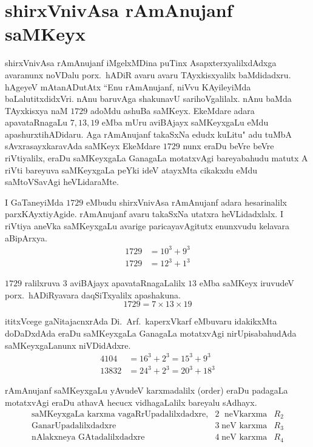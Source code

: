 \chapter{shirxVnivAsa rAmAnujanf saMKeyx}

shirxVnivAsa rAmAnujanf iMgelxMDina puTinx AsapxterxyalilxdAdxga avaranunx noVDalu  porx.~hADiR avaru avaru TAyxkisxyalilx baMdidadxru. hAgeyeV mAtanADutAtx ``Enu rAmAnujanf, niVvu KAyileyiMda baLalutitxdidxVri. nAnu baruvAga shaku\-navU sarihoVgalilalx. nAnu baMda TAyxkisxya naM $1729$ adoMdu ashuBa saMKeyx. EkeMdare adara apavataRnagaLu $7,13,19$ eMba mUru aviBAjayx saMKeyxgaLu eMdu apa\-shurxtihADidaru. Aga rAmAnujanf takaSxNa edudx kuLitu" adu tuMbA sAvxrasayxkaravAda saMKeyx EkeMdare $1729$ nunx eraDu beVre beVre riVtiyalilx, eraDu saMKeyxgaLa GanagaLa motatxvAgi bareyabahudu matutx A riVti bareyuva saMKeyxgaLa peYki ideV atayxMta cikakxdu eMdu saMtoVSavAgi heVLidaraMte.

I GaTaneyiMda $1729$ eMbudu shirxVnivAsa rAmAnujanf adara hesarinalilx parxKAyxtiyAgide. rAmAnujanf avaru takaSxNa utatxra heVLidadxlalx. I riVtiya aneVka saMKeyxgaLu avarige paricayavAgitutx enunxvudu kelavara aBipArxya.
\begin{align*}
1729 &= 10^3+9^3\\
1729 &= 12^3+1^3 
\end{align*}

$1729$ ralilxruva $3$ aviBAjayx apavataRnagaLalilx $13$ eMba saMKeyx iruvudeV porx.~hADiRyavara daqSiTxyalilx apashakuna.
$$
1729 = 7\times 13 \times 19
$$

ititxVcege gaNitajacnxrAda Di.~Arf.\ kaperxVkarf eMbuvaru idakikxMta doDaDxdAda eraDu saMKeyxgaLa GanagaLa motatxvAgi nirUpisabahudAda saMKeyxgaLanunx niVDidAdxre.
\begin{align*}
4104 &= 16^3 + 2^3 = 15^3 +9^3\\
13832 &= 24^3 +2^3 = 20^3 +18^3
\end{align*}

rAmAnujanf saMKeyxgaLu yAvudeV karxmadalilx {\rm(order)} eraDu padagaLa motatx\-vAgi eraDu athavA hecucx vidhagaLalilx bareyalu sAdhayx.
$$
\begin{array}{rll}
\text{saMKeyxgaLa karxma vagaRrUpadalilxdadxre,} & 2\; \text{ neVkarxma} & R_2\\
\text{GanarUpadalilxdadxre}                      & 3\; \text{neV karxma} & R_3\\
\text{nAlakxneya GAtadalilxdadxre}               & 4\; \text{neV karxma} & R_4
\end{array}
$$


